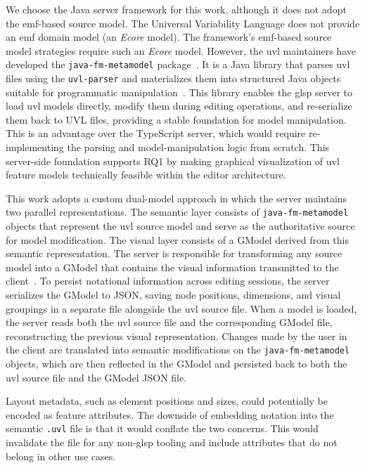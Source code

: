 We choose the Java server framework for this work, although it does not adopt the \gls{emf}-based source model.
The Universal Variability Language does not provide an \gls{emf} domain model (an \textit{Ecore} model).
The framework's \gls{emf}-based source model strategies require such an \textit{Ecore} model.
However, the \gls{uvl} maintainers have developed the \texttt{java-fm-metamodel} package~\cite{noauthor_universal-variability-languagejava-fm-metamodel_2026}.
It is a Java library that parses \gls{uvl} files using the \texttt{uvl-parser} and materializes them into structured Java objects suitable for programmatic manipulation~\cite{sundermann_uvlparser_2023}.
This library enables the \gls{glsp} server to load \gls{uvl} models directly, modify them during editing operations, and re-serialize them back to UVL files, providing a stable foundation for model manipulation.
This is an advantage over the TypeScript server, which would require re-implementing the parsing and model-manipulation logic from scratch.
This server-side foundation supports RQ1 by making graphical visualization of \gls{uvl} feature models technically feasible within the editor architecture.

This work adopts a custom dual-model approach in which the server maintains two parallel representations.
The semantic layer consists of \texttt{java-fm-metamodel} objects that represent the \gls{uvl} source model and serve as the authoritative source for model modification.
The visual layer consists of a GModel derived from this semantic representation.
The server is responsible for transforming any source model into a GModel that contains the visual information transmitted to the client~\cite{bork_vision_2024}.
To persist notational information across editing sessions, the server serializes the GModel to JSON, saving node positions, dimensions, and visual groupings in a separate file alongside the \gls{uvl} source file.
When a model is loaded, the server reads both the \gls{uvl} source file and the corresponding GModel file, reconstructing the previous visual representation.
Changes made by the user in the client are translated into semantic modifications on the \texttt{java-fm-metamodel} objects, which are then reflected in the GModel and persisted back to both the \gls{uvl} source file and the GModel JSON file.

Layout metadata, such as element positions and sizes, could potentially be encoded as feature attributes.
The downside of embedding notation into the semantic \texttt{.uvl} file is that it would conflate the two concerns.
This would invalidate the file for any non-\gls{glsp} tooling and include attributes that do not belong in other use cases.

